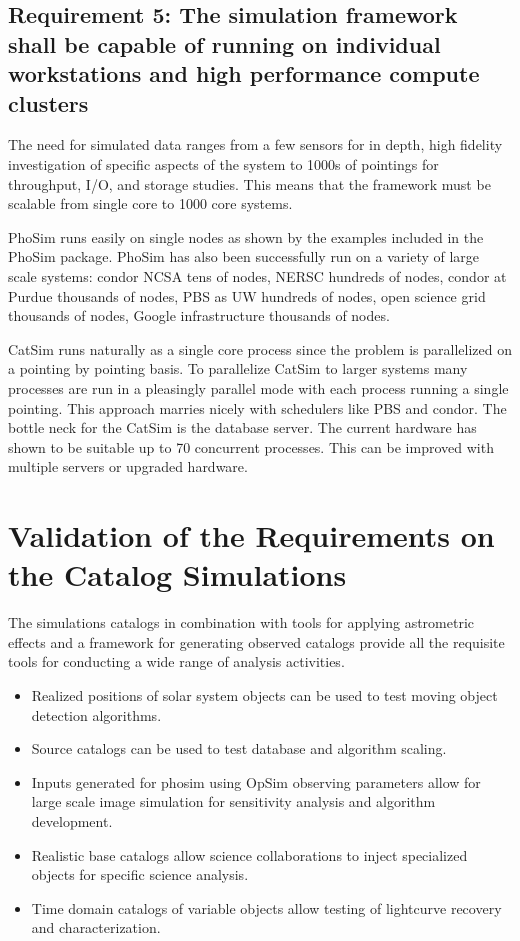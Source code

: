 \documentclass[]{article}
\begin{document}
\subsection{Requirement 5: The simulation framework shall be capable of running on individual workstations 
and high performance compute clusters}
The need for simulated data ranges from a few sensors for in depth, high fidelity investigation of specific
aspects of the system to 1000s of pointings for throughput, I/O, and storage studies.  This means that
the framework must be scalable from single core to 1000 core systems.  

PhoSim runs easily on single nodes as shown by the examples included in the PhoSim package.  PhoSim has also
been successfully run on a variety of large scale systems: condor NCSA tens of nodes, NERSC hundreds of nodes, condor at Purdue thousands
of nodes, PBS as UW hundreds of nodes, open science grid thousands of nodes, Google infrastructure thousands of nodes.

CatSim runs naturally as a single core process since the problem is parallelized on a pointing by pointing basis.
To parallelize CatSim to larger systems many processes are run in a pleasingly parallel mode with each process running
a single pointing.  This approach marries nicely with schedulers like PBS and condor.  The bottle neck for 
the CatSim is the database server.  The current hardware has shown to be suitable up to 70 concurrent processes.  This 
can be improved with multiple servers or upgraded hardware.

\section{Validation of the Requirements on the Catalog Simulations}
The simulations catalogs in combination with tools for applying astrometric effects and a 
framework for generating observed catalogs provide all the requisite tools for conducting a 
wide range of analysis activities.
\begin{itemize}
\item Realized positions of solar system objects can be used to test moving object detection algorithms.
\item Source catalogs can be used to test database and algorithm scaling.
\item Inputs generated for phosim using OpSim observing parameters allow for large scale image simulation
for sensitivity analysis and algorithm development.
\item Realistic base catalogs allow science collaborations to inject specialized objects for specific science
analysis.
\item Time domain catalogs of variable objects allow testing of lightcurve recovery and characterization.
\end{itemize}
\end{document}
